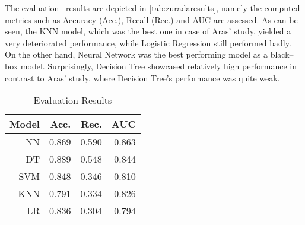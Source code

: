 The evaluation  results are depicted in \autoref{tab:zuradaresults}, namely the computed metrics such as Accuracy (Acc.), Recall (Rec.) and AUC are assessed.
As can be seen, the KNN model, which was the best one in case of Aras' study, yielded a very deteriorated performance, while Logistic Regression still performed badly.
On the other hand, Neural Network was the best performing model as a black--box model. Surprisingly, Decision Tree showcased relatively high performance in contrast to Aras' study, where Decision Tree's performance was quite weak.
\begin{table}[H]
    \small
    \setlength{\tabcolsep}{8pt}
    \renewcommand{\arraystretch}{1.3}
    \centering
    \caption[Evaluation Results \citep{zurada2014classification}]{Evaluation Results \citep{zurada2014classification}}\label{tab:zuradaresults}
    \begin{tabular}{r r r r}
    \toprule
    \textbf{Model} & \textbf{Acc.} & \textbf{Rec.} & \textbf{AUC}\\
    \midrule
    \hline
    NN & 0.869 & 0.590 & 0.863 \\
    DT & 0.889 & 0.548 & 0.844 \\
    SVM & 0.848 & 0.346 & 0.810 \\
    KNN & 0.791 & 0.334 & 0.826 \\
    LR & 0.836 & 0.304 & 0.794 \\
    \hline
    \bottomrule
    \end{tabular}
    \vspace{0.35em}
    
    \vspace{-1em}
\end{table}

